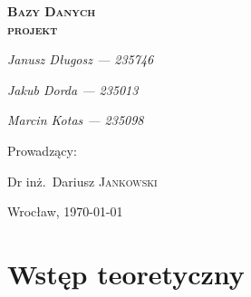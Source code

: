 \documentclass[polish, 11pt]{article}
\begin{document}
\begin{titlepage}
    \centering
    {\scshape\Huge\bfseries Bazy Danych\\ projekt \par}
    \vspace{1cm}
   
    {\itshape\Large Janusz Długosz --- 235746\/\par}
    {\itshape\Large Jakub Dorda --- 235013\/\par}
    {\itshape\Large Marcin Kotas --- 235098\/\par}
    \vfill
    Prowadzący:\par
    Dr inż.~Dariusz \textsc{Jankowski}

    \vfill

    {\large Wrocław, \today\par}

\end{titlepage}

\tableofcontents
\newpage

\section{Wstęp teoretyczny}
\end{document}
